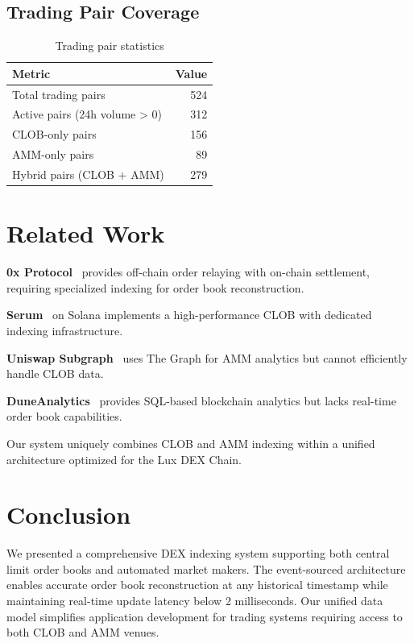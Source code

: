 \documentclass[11pt,twocolumn]{article}
\begin{document}
\subsection{Trading Pair Coverage}

\begin{table}[h]
\centering
\caption{Trading pair statistics}
\begin{tabular}{@{}lr@{}}
\toprule
Metric & Value \\
\midrule
Total trading pairs & 524 \\
Active pairs (24h volume > 0) & 312 \\
CLOB-only pairs & 156 \\
AMM-only pairs & 89 \\
Hybrid pairs (CLOB + AMM) & 279 \\
\bottomrule
\end{tabular}
\label{tab:pair-coverage}
\end{table}

\section{Related Work}

\textbf{0x Protocol}~\cite{0x} provides off-chain order relaying with on-chain settlement, requiring specialized indexing for order book reconstruction.

\textbf{Serum}~\cite{serum} on Solana implements a high-performance CLOB with dedicated indexing infrastructure.

\textbf{Uniswap Subgraph}~\cite{uniswap} uses The Graph for AMM analytics but cannot efficiently handle CLOB data.

\textbf{DuneAnalytics}~\cite{dune} provides SQL-based blockchain analytics but lacks real-time order book capabilities.

Our system uniquely combines CLOB and AMM indexing within a unified architecture optimized for the Lux DEX Chain.

\section{Conclusion}

We presented a comprehensive DEX indexing system supporting both central limit order books and automated market makers. The event-sourced architecture enables accurate order book reconstruction at any historical timestamp while maintaining real-time update latency below 2 milliseconds. Our unified data model simplifies application development for trading systems requiring access to both CLOB and AMM venues.
\end{document}

